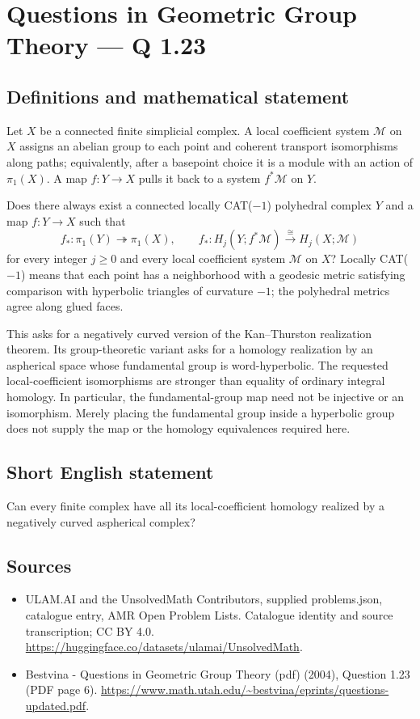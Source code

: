 \documentclass[11pt,a4paper]{article}
\begin{document}
\section*{Questions in Geometric Group Theory — Q 1.23}\label{statement}

\subsection{Definitions and mathematical statement}
Let $X$ be a connected finite simplicial complex. A local coefficient system $\mathcal M$ on $X$ assigns an abelian group to each point and coherent transport isomorphisms along paths; equivalently, after a basepoint choice it is a module with an action of $\pi_1(X)$. A map $f:Y\to X$ pulls it back to a system $f^*\mathcal M$ on $Y$.

Does there always exist a connected locally CAT($-1$) polyhedral complex $Y$ and a map $f:Y\to X$ such that
\[
 f_*:\pi_1(Y)\twoheadrightarrow\pi_1(X),\qquad
 f_*:H_j(Y;f^*\mathcal M)\xrightarrow{\cong}H_j(X;\mathcal M)
\]
for every integer $j\geq0$ and every local coefficient system $\mathcal M$ on $X$? Locally CAT($-1$) means that each point has a neighborhood with a geodesic metric satisfying comparison with hyperbolic triangles of curvature $-1$; the polyhedral metrics agree along glued faces.

This asks for a negatively curved version of the Kan--Thurston realization theorem. Its group-theoretic variant asks for a homology realization by an aspherical space whose fundamental group is word-hyperbolic. The requested local-coefficient isomorphisms are stronger than equality of ordinary integral homology. In particular, the fundamental-group map need not be injective or an isomorphism. Merely placing the fundamental group inside a hyperbolic group does not supply the map or the homology equivalences required here.
\subsection{Short English statement}
Can every finite complex have all its local-coefficient homology realized by a negatively curved aspherical complex?
\subsection{Sources}
\begin{itemize}
\item[S1] ULAM.AI and the UnsolvedMath Contributors, supplied problems.json, catalogue entry, AMR Open Problem Lists. Catalogue identity and source transcription; CC BY 4.0.
\url{https://huggingface.co/datasets/ulamai/UnsolvedMath}.
\item[S2] Bestvina - Questions in Geometric Group Theory (pdf) (2004), Question 1.23 (PDF page 6). 
\url{https://www.math.utah.edu/~bestvina/eprints/questions-updated.pdf}.
\end{itemize}
\end{document}
